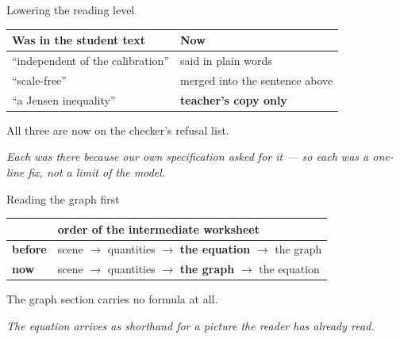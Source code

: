 \documentclass[aspectratio=169,10pt]{beamer}
\newcommand{\takeaway}[1]{\vfill{\footnotesize\itshape\color{cGrey}#1\par}}
\begin{document}
\begin{frame}{Lowering the reading level}
\vfill
\begin{center}
\small
\renewcommand{\arraystretch}{1.6}
\begin{tabular}{@{}p{5.6cm}p{5.6cm}@{}}
\toprule
\rowcolor{cPed!12}
\textbf{Was in the student text} & \textbf{Now} \\
\midrule
``independent of the calibration'' & said in plain words \\
``scale-free'' & merged into the sentence above \\
``a Jensen inequality'' & \textbf{teacher's copy only} \\
\bottomrule
\end{tabular}
\end{center}
\vfill
\begin{center}
{\footnotesize All three are now on the checker's refusal list.}
\end{center}
\vfill
\takeaway{Each was there because our own specification asked for it --- so each was a one-line fix,
not a limit of the model.}
\end{frame}

\begin{frame}{Reading the graph first}
\vfill
\begin{center}
\small
\renewcommand{\arraystretch}{1.6}
\begin{tabular}{@{}ll@{}}
\toprule
\rowcolor{cInter!12}
& \textbf{order of the intermediate worksheet} \\
\midrule
{\color{cAccent}\textbf{before}} & scene $\rightarrow$ quantities $\rightarrow$
\textbf{the equation} $\rightarrow$ the graph \\
{\color{cApp}\textbf{now}} & scene $\rightarrow$ quantities $\rightarrow$
\textbf{the graph} $\rightarrow$ the equation \\
\bottomrule
\end{tabular}
\end{center}
\vfill
\begin{center}
{\footnotesize The graph section carries no formula at all.}
\end{center}
\vfill
\takeaway{The equation arrives as shorthand for a picture the reader has already read.}
\end{frame}
\end{document}
